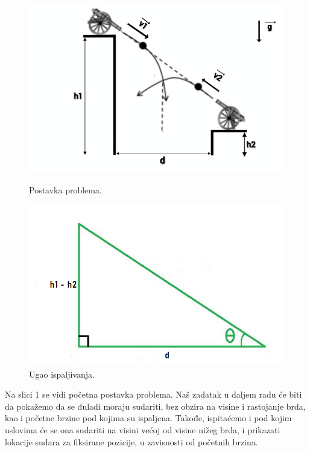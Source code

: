 \documentclass{article}
\begin{document}
\begin{figure}[h]
  \centering
  \begin{minipage}[b]{0.45\linewidth}
    \centering
    \includegraphics[width=\linewidth]{omm_slika.png}
    \caption{Postavka problema.}
    \label{fig:image1}
  \end{minipage}
  \hspace{0.5cm}
  \begin{minipage}[b]{0.45\linewidth}
    \centering
    \includegraphics[width=\linewidth]{trougao_slika.png}
    \caption{Ugao ispaljivanja.}
    \label{fig:image2}
  \end{minipage}
  \label{fig:my_images}
\end{figure}

Na slici 1 se vidi početna postavka problema. Naš zadatak u daljem radu će biti da pokažemo da se đuladi moraju sudariti, bez obzira na visine i rastojanje brda, kao i početne brzine pod kojima su ispaljena.
\newline
Takođe, ispitaćemo i pod kojim uslovima će se ona sudariti na visini većoj od visine nižeg brda, i prikazati lokacije sudara za fiksirane pozicije, u zavisnosti od početnih brzina.
\end{document}
